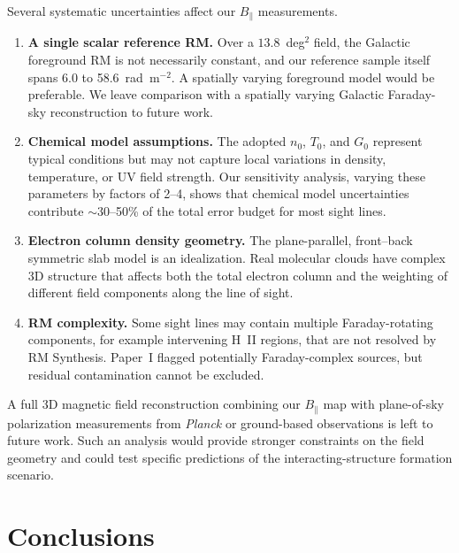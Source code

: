 \documentclass[twocolumn]{aastex701}
\begin{document}
Several systematic uncertainties affect our $B_\parallel$ measurements.

\begin{enumerate}
    \item \textbf{A single scalar reference RM.} Over a $13.8$~deg$^2$ field,
    the Galactic foreground RM is not necessarily constant, and our reference
    sample itself spans 6.0 to 58.6~rad~m$^{-2}$. A spatially varying
    foreground model would be preferable. We leave comparison with a spatially
    varying Galactic Faraday-sky reconstruction to future work.

    \item \textbf{Chemical model assumptions.} The adopted $n_0$, $T_0$, and
    $G_0$ represent typical conditions but may not capture local variations in
    density, temperature, or UV field strength. Our sensitivity analysis,
    varying these parameters by factors of 2--4, shows that chemical model
    uncertainties contribute $\sim 30$--50\% of the total error budget for
    most sight lines.

    \item \textbf{Electron column density geometry.} The plane-parallel,
    front--back symmetric slab model is an idealization. Real molecular clouds
    have complex 3D structure that affects both the total electron column and
    the weighting of different field components along the line of sight.

    \item \textbf{RM complexity.} Some sight lines may contain multiple
    Faraday-rotating components, for example intervening H~II regions, that
    are not resolved by RM Synthesis. Paper~I flagged potentially
    Faraday-complex sources, but residual contamination cannot be excluded.
\end{enumerate}

A full 3D magnetic field reconstruction combining our $B_\parallel$ map with
plane-of-sky polarization measurements from \textit{Planck} or ground-based
observations is left to future work. Such an analysis would provide stronger
constraints on the field geometry and could test specific predictions of the
interacting-structure formation scenario.

\section{Conclusions}
\label{sec:conclusions}
\end{document}
